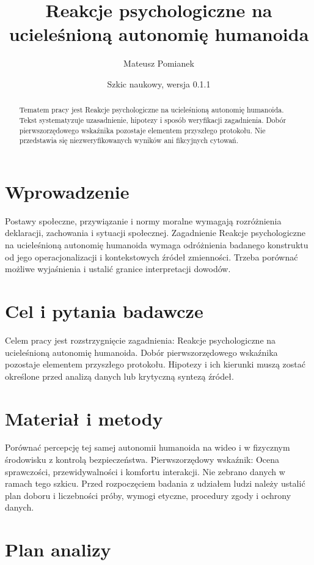 \documentclass[11pt,a4paper]{article}
\title{Reakcje psychologiczne na ucieleśnioną autonomię humanoida}
\author{Mateusz Pomianek}
\date{Szkic naukowy, wersja 0.1.1}
\begin{document}
\maketitle

\begin{abstract}

Tematem pracy jest Reakcje psychologiczne na ucieleśnioną autonomię humanoida. Tekst systematyzuje uzasadnienie, hipotezy i sposób weryfikacji zagadnienia. Dobór pierwszorzędowego wskaźnika pozostaje elementem przyszłego protokołu. Nie przedstawia się niezweryfikowanych wyników ani fikcyjnych cytowań.

\end{abstract}

\section{Wprowadzenie}

Postawy społeczne, przywiązanie i normy moralne wymagają rozróżnienia deklaracji, zachowania i sytuacji społecznej. Zagadnienie Reakcje psychologiczne na ucieleśnioną autonomię humanoida wymaga odróżnienia badanego konstruktu od jego operacjonalizacji i kontekstowych źródeł zmienności. Trzeba porównać możliwe wyjaśnienia i ustalić granice interpretacji dowodów.

\section{Cel i pytania badawcze}

Celem pracy jest rozstrzygnięcie zagadnienia: Reakcje psychologiczne na ucieleśnioną autonomię humanoida. Dobór pierwszorzędowego wskaźnika pozostaje elementem przyszłego protokołu. Hipotezy i ich kierunki muszą zostać określone przed analizą danych lub krytyczną syntezą źródeł.

\section{Materiał i metody}

Porównać percepcję tej samej autonomii humanoida na wideo i w fizycznym środowisku z kontrolą bezpieczeństwa. Pierwszorzędowy wskaźnik: Ocena sprawczości, przewidywalności i komfortu interakcji. Nie zebrano danych w ramach tego szkicu. Przed rozpoczęciem badania z udziałem ludzi należy ustalić plan doboru i liczebności próby, wymogi etyczne, procedury zgody i ochrony danych.

\section{Plan analizy}
\end{document}
